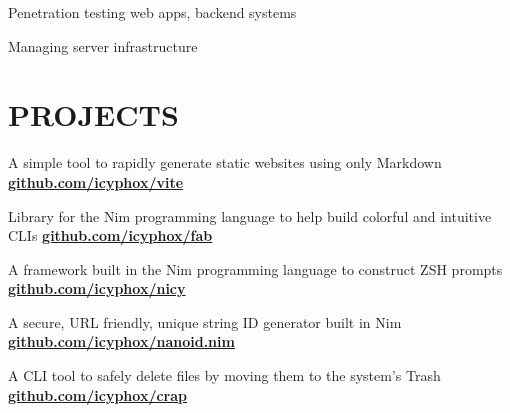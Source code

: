 \documentclass[]{resume-openfont}
\begin{document}
\begin{minipage}[t]{0.66\textwidth}
	\begin{tightemize}
	\item Penetration testing web apps, backend systems
	\item Managing server infrastructure
	\end{tightemize}
\sectionsep



\section{PROJECTS}
A simple tool to rapidly generate static websites using only Markdown \\
\href{https://github.com/icyphox/vite}{\bf github.com/icyphox/vite}
\sectionsep

Library for the Nim programming language to help build colorful and intuitive CLIs
\href{https://github.com/icyphox/fab}{\bf github.com/icyphox/fab}
\sectionsep

A framework built in the Nim programming language to construct ZSH prompts
\href{https://github.com/icyphox/nicy}{\bf github.com/icyphox/nicy}
\sectionsep

A secure, URL friendly, unique string ID generator built in Nim
\href{https://github.com/icyphox/nanoid.nim}{\bf github.com/icyphox/nanoid.nim}
\sectionsep

A CLI tool to safely delete files by moving them to the system's Trash
\href{https://github.com/icyphox/crap}{\bf github.com/icyphox/crap}
\sectionsep

\end{minipage} 
\end{document}
